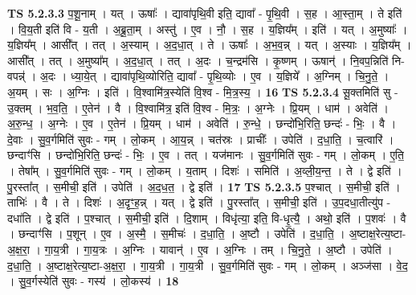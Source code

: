 \documentclass[17pt]{extarticle}
\begin{document}
                  \newline
                                \textbf{ TS 5.2.3.3} \newline
                  प॒शू॒नाम् । यत् । ऊषाः᳚ । द्यावा॑पृथि॒वी इति॒ द्यावा᳚ - पृ॒थि॒वी । स॒ह । आ॒स्ता॒म् । ते इति॑ । वि॒य॒ती इति॑ वि - य॒ती । अ॒ब्रू॒ता॒म् । अस्तु॑ । ए॒व । नौ॒ । स॒ह । य॒ज्ञिय᳚म् । इति॑ । यत् । अ॒मुष्याः᳚ । य॒ज्ञिय᳚म् । आसी᳚त् । तत् । अ॒स्याम् । अ॒द॒धा॒त् । ते । ऊषाः᳚ । अ॒भ॒व॒न्न् । यत् । अ॒स्याः । य॒ज्ञिय᳚म् । आसी᳚त् । तत् । अ॒मुष्या᳚म् । अ॒द॒धा॒त् । तत् । अ॒दः । च॒न्द्रम॑सि । कृ॒ष्णम् । ऊषान्॑ । नि॒वप॒न्निति॑ नि-वपन्न्॑ । अ॒दः । ध्या॒ये॒त् । द्यावा॑पृथि॒व्योरिति॒ द्यावा᳚ - पृ॒थि॒व्योः । ए॒व । य॒ज्ञिये᳚ । अ॒ग्निम् । चि॒नु॒ते॒ । अ॒यम् । सः । अ॒ग्निः । इति॑ । वि॒श्वामि॑त्र॒स्येति॑ वि॒श्व - मि॒त्र॒स्य॒ । \textbf{  16} \newline
                  \newline
                                \textbf{ TS 5.2.3.4} \newline
                  सू॒क्तमिति॑ सु - उ॒क्तम् । भ॒व॒ति॒ । ए॒तेन॑ । वै । वि॒श्वामि॑त्र॒ इति॑ वि॒श्व - मि॒त्रः॒ । अ॒ग्नेः । प्रि॒यम् । धाम॑ । अवेति॑ । अ॒रु॒न्ध॒ । अ॒ग्नेः । ए॒व । ए॒तेन॑ । प्रि॒यम् । धाम॑ । अवेति॑ । रु॒न्धे॒ । छन्दो॑भि॒रिति॒ छन्दः॑ - भिः॒ । वै । दे॒वाः । सु॒व॒र्गमिति॑ सुवः - गम् । लो॒कम् । आ॒य॒न्न् । चत॑स्रः । प्राचीः᳚ । उपेति॑ । द॒धा॒ति॒ । च॒त्वारि॑ । छन्दाꣳ॑सि । छन्दो॑भि॒रिति॒ छन्दः॑ - भिः॒ । ए॒व । तत् । यज॑मानः । सु॒व॒र्गमिति॑ सुवः - गम् । लो॒कम् । ए॒ति॒ । तेषा᳚म् । सु॒व॒र्गमिति॑ सुवः - गम् । लो॒कम् । य॒ताम् । दिशः॑ । समिति॑ । अ॒व्ली॒य॒न्त॒ । ते । द्वे इति॑ । पु॒रस्ता᳚त् । स॒मीची॒ इति॑ । उपेति॑ । अ॒द॒ध॒त॒ । द्वे इति॑ । \textbf{  17} \newline
                  \newline
                                \textbf{ TS 5.2.3.5} \newline
                  प॒श्चात् । स॒मीची॒ इति॑ । ताभिः॑ । वै । ते । दिशः॑ । अ॒दृꣳ॒॒ह॒न्न् । यत् । द्वे इति॑ । पु॒रस्ता᳚त् । स॒मीची॒ इति॑ । उ॒प॒दधा॒तीत्यु॑प - दधा॑ति । द्वे इति॑ । प॒श्चात् । स॒मीची॒ इति॑ । दि॒शाम् । विधृ॑त्या॒ इति॒ वि-धृ॒त्यै॒ । अथो॒ इति॑ । प॒शवः॑ । वै । छन्दाꣳ॑सि । प॒शून् । ए॒व । अ॒स्मै॒ । स॒मीचः॑ । द॒धा॒ति॒ । अ॒ष्टौ । उपेति॑ । द॒धा॒ति॒ । अ॒ष्टाक्ष॒रेत्य॒ष्टा-अ॒क्ष॒रा॒ । गा॒य॒त्री । गा॒य॒त्रः । अ॒ग्निः । यावान्॑ । ए॒व । अ॒ग्निः । तम् । चि॒नु॒ते॒ । अ॒ष्टौ । उपेति॑ । द॒धा॒ति॒ । अ॒ष्टाक्ष॒रेत्य॒ष्टा-अ॒क्ष॒रा॒ । गा॒य॒त्री । गा॒य॒त्री । सु॒व॒र्गमिति॑ सुवः - गम् । लो॒कम् । अञ्ज॑सा । वे॒द॒ । सु॒व॒र्गस्येति॑ सुवः - गस्य॑ । लो॒कस्य॑ । \textbf{  18} \newline
\end{document}

